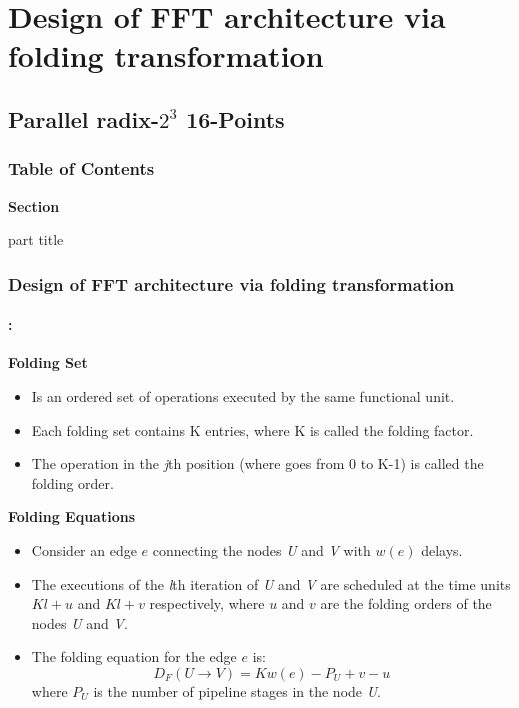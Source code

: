 \section{Design of FFT architecture via folding transformation}
\subsection{Parallel radix-$2^3$ 16-Points}
\begin{frame}
  \frametitle{\textbf{Table of Contents}}
  \begin{center}
    {\vspace{-1.5cm}\Large \textbf{Section \thesection}\vspace{0.5cm}}
    \begin{beamercolorbox}[
      sep=8pt,center]{part title}
      \textbf{\insertsection}
    \end{beamercolorbox}
  \end{center}
\end{frame}


\begin{frame}
	\frametitle{\textbf{Design of FFT architecture via folding transformation}}
	\framesubtitle{\secname : \subsecname}
	
	\begin{block}{\centering \textbf{Folding Set}}
		\begin{itemize}\justifying\footnotesize
        	\item Is an ordered set of operations executed by the same functional unit.
        	\item Each folding set contains K entries, where K is called the folding factor.
        	\item The operation in the \textit{j}th position (where goes from 0 to K-1) is called the folding order.
       	\end{itemize}
	\end{block}

	\begin{block}{\centering \textbf{Folding Equations}}
		\begin{itemize}\justifying\footnotesize
			\item Consider an edge $e$ connecting the nodes \textit{U} and \textit{V} with $w(e)$ delays. 
			\item The executions of the \textit{l}th iteration of \textit{U} and \textit{V} are scheduled at the time units $Kl+u$ and $Kl+v$ respectively, where $u$ and $v$ are the folding orders of the nodes \textit{U} and \textit{V}.
			\item  The folding equation for the edge $e$ is:
			\begin{equation}\label{eqn:fold_equation}
				D_F(U \to V) = Kw(e)-P_U+v-u
			\end{equation}
			where $P_U$ is the number of pipeline stages in the node \textit{U}.
	    \end{itemize}
	\end{block}
\end{frame}


